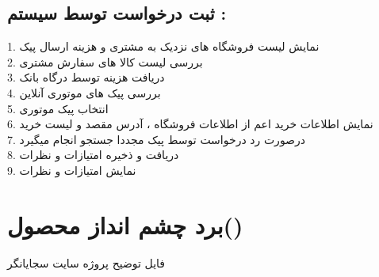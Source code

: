 \documentclass[12pt,onecolumn,a4paper]{article}
\begin{document}
\subsection{
ثبت درخواست توسط سیستم :
}
1.	نمایش لیست فروشگاه های نزدیک به مشتری و هزینه ارسال پیک\\
2.	بررسی لیست کالا های سفارش مشتری\\
3.	دریافت هزینه توسط درگاه بانک\\
4.	بررسی پیک های موتوری آنلاین\\
5.	انتخاب پیک موتوری\\
6.	نمایش اطلاعات خرید اعم از اطلاعات فروشگاه ، آدرس مقصد و لیست خرید\\
7.	درصورت رد درخواست توسط پیک مجددا جستجو انجام میگیرد\\
8.	دریافت و ذخیره امتیازات و نظرات\\
9.	نمایش امتیازات و نظرات\\

\newpage
\section{برد چشم انداز محصول()}
\begin{figure}[!h]
\caption{}\label{figpvb}
\end{figure}


\newpage
\begin{thebibliography}{99}
\bibitem{}
فایل توضیح پروژه
\bibitem{}
سایت سجایانگر
\end{thebibliography}
\end{document}
